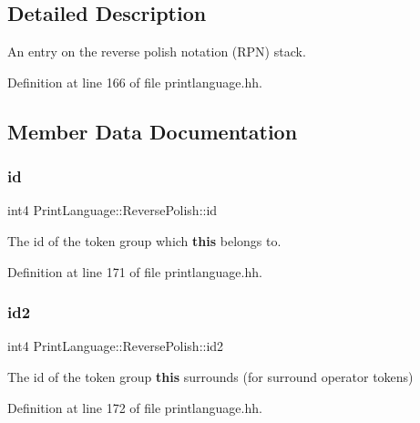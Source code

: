 \subsection{Detailed Description}
An entry on the reverse polish notation (R\+PN) stack. 

Definition at line 166 of file printlanguage.\+hh.



\subsection{Member Data Documentation}
\mbox{\label{struct_print_language_1_1_reverse_polish_aeba0caecbdfe9a1a3ea20217c74b5820}} 
\subsubsection{\texorpdfstring{id}{id}}
{\footnotesize\ttfamily int4 Print\+Language\+::\+Reverse\+Polish\+::id}



The id of the token group which {\bfseries{this}} belongs to. 



Definition at line 171 of file printlanguage.\+hh.

\mbox{\label{struct_print_language_1_1_reverse_polish_afcd819d295e7895a687dbeb3d7c6473c}} 
\subsubsection{\texorpdfstring{id2}{id2}}
{\footnotesize\ttfamily int4 Print\+Language\+::\+Reverse\+Polish\+::id2\hspace{0.3cm}{\ttfamily [mutable]}}



The id of the token group {\bfseries{this}} surrounds (for surround operator tokens) 



Definition at line 172 of file printlanguage.\+hh.

\mbox{\label{struct_print_language_1_1_reverse_polish_a0b591df65fea01d8bbf975ca190e07d5}} 

